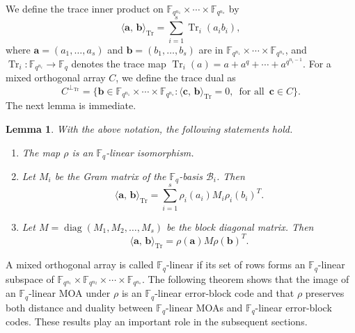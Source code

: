 \documentclass[11pt]{article}
\newtheorem{Definition and Notation}[Theorem]{Definition and Notation}
\newtheorem{Lemma}[Theorem]{Lemma}
\begin{document}
We define the trace inner product on $\mathbb{F}_{q^{n_1}}\times\cdots\times\mathbb{F}_{q^{n_s}}$ by
    $$
    \langle \mathbf{a},\,\mathbf{b}\rangle_{\operatorname{Tr}} = \sum_{i=1}^s \operatorname{Tr}_i(a_ib_i),
    $$
where $\mathbf{a} = (a_1, \dots, a_s)$ and $\mathbf{b} = (b_1, \dots, b_s)$ are in $\mathbb{F}_{q^{n_1}}\times\cdots\times\mathbb{F}_{q^{n_s}}$, and $ \operatorname{Tr}_{i} : \mathbb{F}_{q^{n_i}} \to \mathbb{F}_q $ denotes the trace map $\operatorname{Tr}_{i}(a) = a + a^q + \cdots + a^{q^{n_i-1}}.$
For a mixed orthogonal array $C$, we define the trace dual as
$$
C^{\perp_{\text{Tr}}} = \Big\{ \mathbf{b} \in \mathbb{F}_{q^{n_1}}\times\cdots\times\mathbb{F}_{q^{n_s}} \colon \langle \mathbf{c},\, \mathbf{b}\rangle_{\operatorname{Tr}}= 0,\, \text{ for all }\, \mathbf{c}  \in C \Big\}.
$$
The next lemma is immediate.
\begin{Lemma}\label{ma35} With the above notation, the following statements hold.
    \begin{enumerate}
     \item The map $\rho$ is an $\mathbb F_q$-linear isomorphism.
      \item Let $M_i$ be the Gram matrix of the $\mathbb{F}_q$-basis $\mathcal{B}_i$. Then
    $$\langle \mathbf{a},\,\mathbf{b}\rangle_{\operatorname{Tr}} = \sum_{i=1}^s \rho_i(a_i) M_i\rho_i(b_i)^T.$$
    \item Let $M=\operatorname{diag}(M_1,M_2,\ldots,M_s)$ be the block diagonal matrix. Then
    $$\langle \mathbf{a},\,\mathbf{b}\rangle_{\operatorname{Tr}} = \rho(\mathbf{a})M\rho(\mathbf{b})^T.$$  
\end{enumerate}
\end{Lemma}

A mixed orthogonal array is called $\mathbb F_q$-linear if its set of rows forms an $\mathbb F_q$-linear subspace of $\mathbb{F}_{q^{n_1}}\times\mathbb{F}_{q^{n_2}}\times\cdots\times\mathbb{F}_{q^{n_s}}.$ The following theorem shows that the image of an $\mathbb F_q$-linear MOA under $\rho$ is an $\mathbb F_q$-linear error-block code and that $\rho$ preserves both distance and duality between $\mathbb F_q$-linear MOAs and $\mathbb F_q$-linear error-block codes. These results play an important role in the subsequent sections.
\end{document}
